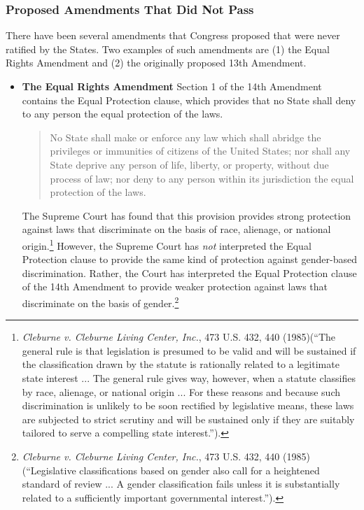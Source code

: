 \subsubsection{Proposed Amendments That Did Not Pass}
There have been several amendments that Congress proposed that were never ratified by the States.  Two examples of such amendments are (1) the Equal Rights Amendment and (2) the originally proposed 13th Amendment.


\begin{itemize}
\item \textbf{The Equal Rights Amendment}
Section 1 of the 14th Amendment contains the Equal Protection clause, which provides that no State shall deny to any person the equal protection of the laws.  

\begin{quote}
No State shall make or enforce any law which shall abridge the privileges or immunities of citizens of the United States; nor shall any State deprive any person of life, liberty, or property, without due process of law; nor deny to any person within its jurisdiction the equal protection of the laws.
\end{quote}

The Supreme Court has found that this provision provides strong protection against laws that discriminate on the basis of race, alienage, or national origin.\footnote{\textit{Cleburne v. Cleburne Living Center, Inc.}, 473 U.S. 432, 440 (1985)(``The general rule is that legislation is presumed to be valid and will be sustained if the classification drawn by the statute is rationally related to a legitimate state interest ... The general rule gives way, however, when a statute classifies by race, alienage, or national origin ... For these reasons and because such discrimination is unlikely to be soon rectified by legislative means, these laws are subjected to strict scrutiny and will be sustained only if they are suitably tailored to serve a compelling state interest.'').}
However, the Supreme Court has \textit{not} interpreted the Equal Protection clause to provide the same kind of protection against gender-based discrimination.  Rather, the Court has interpreted the Equal Protection clause of the 14th Amendment to provide weaker protection against laws that discriminate on the basis of gender.\footnote{\textit{Cleburne v. Cleburne Living Center, Inc.}, 473 U.S. 432, 440 (1985)(``Legislative classifications based on gender also call for a heightened standard of review ... A gender classification fails unless it is substantially related to a sufficiently important governmental interest.'').}


\end{itemize}
